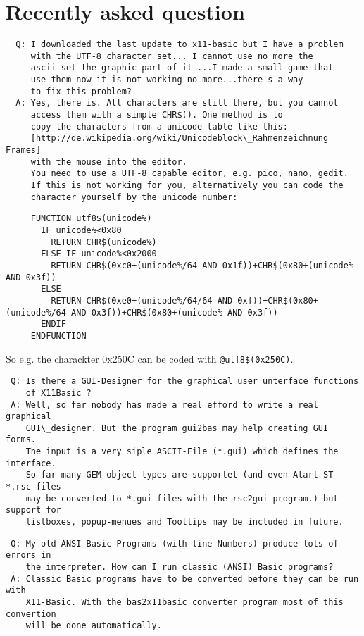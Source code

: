 \section*{Recently asked question}

\begin{verbatim}
  Q: I downloaded the last update to x11-basic but I have a problem 
     with the UTF-8 character set... I cannot use no more the 
     ascii set the graphic part of it ...I made a small game that 
     use them now it is not working no more...there's a way 
     to fix this problem?
  A: Yes, there is. All characters are still there, but you cannot 
     access them with a simple CHR$(). One method is to 
     copy the characters from a unicode table like this: 
     [http://de.wikipedia.org/wiki/Unicodeblock\_Rahmenzeichnung Frames] 
     with the mouse into the editor. 
     You need to use a UTF-8 capable editor, e.g. pico, nano, gedit.
     If this is not working for you, alternatively you can code the 
     character yourself by the unicode number:
\end{verbatim}

  {\footnotesize\begin{verbatim}
     FUNCTION utf8$(unicode%)
       IF unicode%<0x80
         RETURN CHR$(unicode%)
       ELSE IF unicode%<0x2000
         RETURN CHR$(0xc0+(unicode%/64 AND 0x1f))+CHR$(0x80+(unicode% AND 0x3f))
       ELSE
         RETURN CHR$(0xe0+(unicode%/64/64 AND 0xf))+CHR$(0x80+(unicode%/64 AND 0x3f))+CHR$(0x80+(unicode% AND 0x3f))  
       ENDIF
     ENDFUNCTION
 \end{verbatim} }

     So e.g. the charackter 0x250C can be coded with \verb|@utf8$(0x250C)|.


\begin{verbatim}
 Q: Is there a GUI-Designer for the graphical user unterface functions 
    of X11Basic ?
 A: Well, so far nobody has made a real efford to write a real graphical 
    GUI\_designer. But the program gui2bas may help creating GUI forms. 
    The input is a very siple ASCII-File (*.gui) which defines the interface. 
    So far many GEM object types are supportet (and even Atart ST *.rsc-files 
    may be converted to *.gui files with the rsc2gui program.) but support for 
    listboxes, popup-menues and Tooltips may be included in future.
\end{verbatim}


\begin{verbatim}
 Q: My old ANSI Basic Programs (with line-Numbers) produce lots of errors in 
    the interpreter. How can I run classic (ANSI) Basic programs?
 A: Classic Basic programs have to be converted before they can be run with 
    X11-Basic. With the bas2x11basic converter program most of this convertion
    will be done automatically. 
\end{verbatim}


